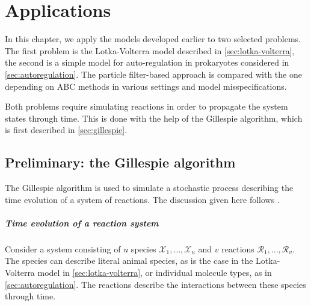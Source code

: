 \chapter{Applications}
\label{chap:applications}

In this chapter, we apply the models developed earlier to two selected problems. The first problem is the Lotka-Volterra model described in \autoref{sec:lotka-volterra}, the second is a simple model for auto-regulation in prokaryotes considered in \autoref{sec:autoregulation}. The particle filter-based approach is compared with the one depending on ABC methods in various settings and model misspecifications.

Both problems require simulating reactions in order to propagate the system states through time. This is done with the help of the Gillespie algorithm, which is first described in \autoref{sec:gillespie}.

\section{Preliminary: the Gillespie algorithm} \label{sec:gillespie}
The Gillespie algorithm \citep{gillespie1, gillespie2} is used to simulate a stochastic process describing the time evolution of a system of reactions. The discussion given here follows \citep{wilkinson-book}.

\paragraph{Time evolution of a reaction system}
Consider a system consisting of $u$ species $\mathcal{X}_1, \ldots, \mathcal{X}_u$ and $v$ reactions $\mathcal{R}_1, \ldots, \mathcal{R}_v$. The species can describe literal animal species, as is the case in the Lotka-Volterra model in \autoref{sec:lotka-volterra}, or individual molecule types, as in \autoref{sec:autoregulation}. The reactions describe the interactions between these species through time.

